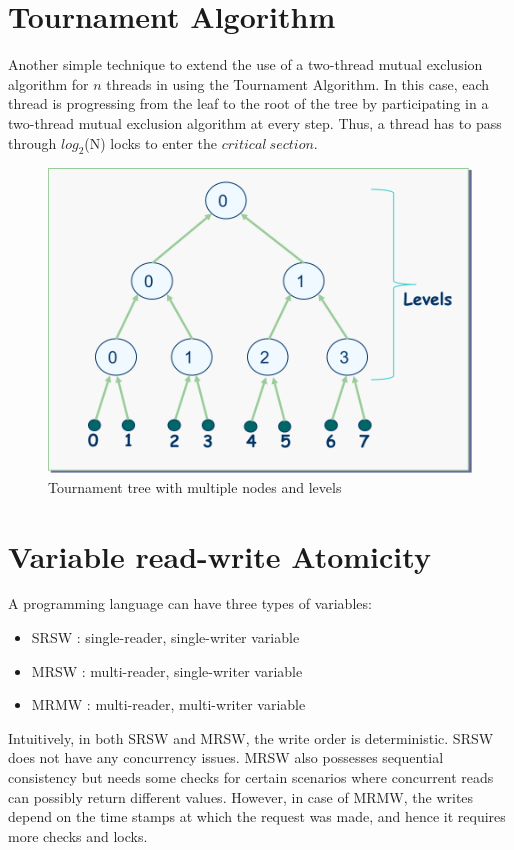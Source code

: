 \documentclass[twoside]{article}
\begin{document}
\section{Tournament Algorithm}
Another simple technique to extend the use of a two-thread mutual exclusion algorithm for $n$ threads in using the Tournament Algorithm. In this case, each thread is progressing from the leaf to the root of the tree by participating in a two-thread mutual exclusion algorithm at every step. Thus, a thread has to pass through $log_2$(N) locks to enter the $critical\ section$. 

\begin{figure}[ht]
    \includegraphics[scale=0.5]{Tournament_tree}
    \centering
    \caption{Tournament tree with multiple nodes and levels}
\end{figure}



\section{Variable read-write Atomicity}
A programming language can have three types of variables:
\begin{itemize}
    \itemsep0em
    \item SRSW : single-reader, single-writer variable
    \item MRSW : multi-reader, single-writer variable
    \item MRMW : multi-reader, multi-writer variable
\end{itemize}

Intuitively, in both SRSW and MRSW, the write order is deterministic. SRSW does not have any concurrency issues. MRSW also possesses sequential consistency but needs some checks for certain scenarios where concurrent reads can possibly return different values. However, in case of MRMW, the writes depend on the time stamps at which the request was made, and hence it requires more checks and locks. 
\end{document}
